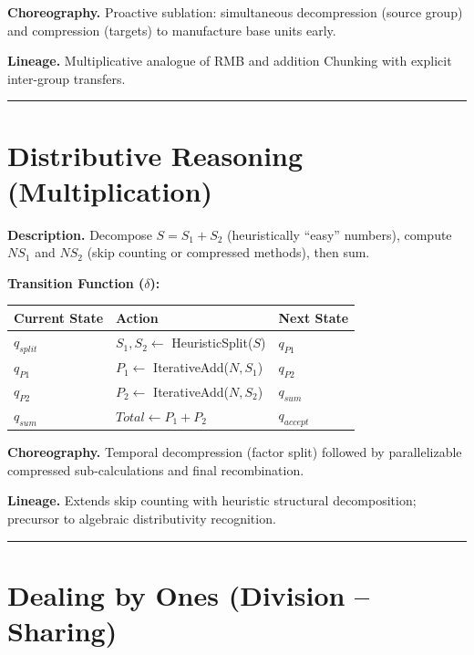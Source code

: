 \documentclass[12pt]{book}
\begin{document}
\textbf{Choreography.} Proactive sublation: simultaneous decompression
(source group) and compression (targets) to manufacture base units
early.

\textbf{Lineage.} Multiplicative analogue of RMB and addition Chunking
with explicit inter-group transfers.

\begin{center}\rule{0.5\linewidth}{0.5pt}\end{center}

\section{Distributive Reasoning
(Multiplication)}\label{distributive-reasoning-multiplication}

\textbf{Description.} Decompose \(S = S_1 + S_2\) (heuristically
``easy'' numbers), compute \(N S_1\) and \(N S_2\) (skip counting or
compressed methods), then sum.

\textbf{Transition Function (\(\delta\)):}

\begin{longtable}[]{@{}lll@{}}
\toprule\noalign{}
Current State & Action & Next State \\
\midrule\noalign{}
\endhead
\bottomrule\noalign{}
\endlastfoot
\(q_{split}\) & \(S_1, S_2 \leftarrow\) HeuristicSplit(\(S\)) &
\(q_{P1}\) \\
\(q_{P1}\) & \(P_1 \leftarrow\) IterativeAdd(\(N, S_1\)) & \(q_{P2}\) \\
\(q_{P2}\) & \(P_2 \leftarrow\) IterativeAdd(\(N, S_2\)) &
\(q_{sum}\) \\
\(q_{sum}\) & \(Total \leftarrow P_1 + P_2\) & \(q_{accept}\) \\
\end{longtable}

\textbf{Choreography.} Temporal decompression (factor split) followed by
parallelizable compressed sub-calculations and final recombination.

\textbf{Lineage.} Extends skip counting with heuristic structural
decomposition; precursor to algebraic distributivity recognition.

\begin{center}\rule{0.5\linewidth}{0.5pt}\end{center}

\section{Dealing by Ones (Division --
Sharing)}\label{dealing-by-ones-division-sharing}
\end{document}
